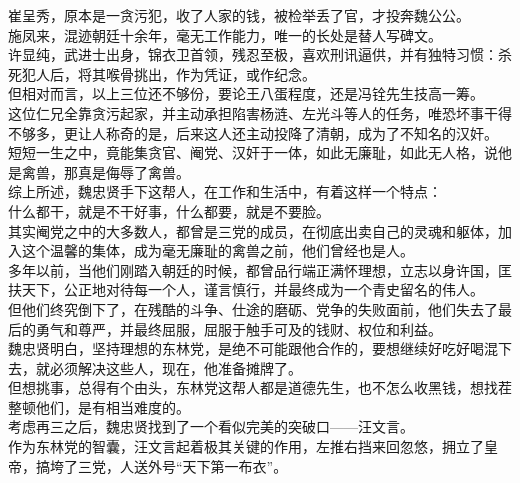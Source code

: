 \begin{multicols}{\theparacolNo}
崔呈秀，原本是一贪污犯，收了人家的钱，被检举丢了官，才投奔魏公公。\\

施凤来，混迹朝廷十余年，毫无工作能力，唯一的长处是替人写碑文。\\

许显纯，武进士出身，锦衣卫首领，残忍至极，喜欢刑讯逼供，并有独特习惯：杀死犯人后，将其喉骨挑出，作为凭证，或作纪念。\\

但相对而言，以上三位还不够份，要论王八蛋程度，还是冯铨先生技高一筹。\\

这位仁兄全靠贪污起家，并主动承担陷害杨涟、左光斗等人的任务，唯恐坏事干得不够多，更让人称奇的是，后来这人还主动投降了清朝，成为了不知名的汉奸。\\

短短一生之中，竟能集贪官、阉党、汉奸于一体，如此无廉耻，如此无人格，说他是禽兽，那真是侮辱了禽兽。\\

综上所述，魏忠贤手下这帮人，在工作和生活中，有着这样一个特点：\\

什么都干，就是不干好事，什么都要，就是不要脸。\\

其实阉党之中的大多数人，都曾是三党的成员，在彻底出卖自己的灵魂和躯体，加入这个温馨的集体，成为毫无廉耻的禽兽之前，他们曾经也是人。\\

多年以前，当他们刚踏入朝廷的时候，都曾品行端正满怀理想，立志以身许国，匡扶天下，公正地对待每一个人，谨言慎行，并最终成为一个青史留名的伟人。\\

但他们终究倒下了，在残酷的斗争、仕途的磨砺、党争的失败面前，他们失去了最后的勇气和尊严，并最终屈服，屈服于触手可及的钱财、权位和利益。\\

魏忠贤明白，坚持理想的东林党，是绝不可能跟他合作的，要想继续好吃好喝混下去，就必须解决这些人，现在，他准备摊牌了。\\

但想挑事，总得有个由头，东林党这帮人都是道德先生，也不怎么收黑钱，想找茬整顿他们，是有相当难度的。\\

考虑再三之后，魏忠贤找到了一个看似完美的突破口——汪文言。\\

作为东林党的智囊，汪文言起着极其关键的作用，左推右挡来回忽悠，拥立了皇帝，搞垮了三党，人送外号“天下第一布衣”。\\


\end{multicols}
